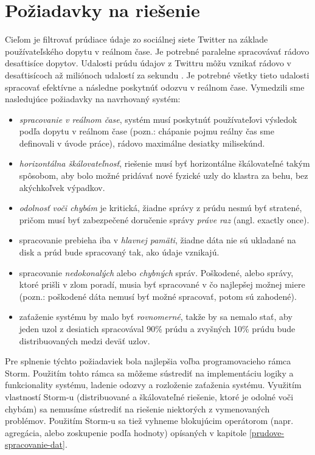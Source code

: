 \section{Požiadavky na riešenie}
Cieľom je filtrovať prúdiace údaje zo sociálnej siete Twitter na základe používateľského dopytu v reálnom čase. Je potrebné paralelne spracovávať rádovo desaťtisíce dopytov. Udalosti prúdu údajov z Twittru môžu vznikať rádovo v desaťtisícoch až miliónoch udalostí za sekundu \citep{mathioudakis2010twittermonitor}. Je potrebné všetky tieto udalosti spracovať efektívne a následne poskytnúť odozvu v reálnom čase. Vymedzili sme nasledujúce požiadavky na navrhovaný systém:
\begin{itemize}
	\item \textit{spracovanie v reálnom čase}, systém musí poskytnúť používateľovi výsledok podľa dopytu v reálnom čase (pozn.: chápanie pojmu reálny čas sme definovali v úvode práce), rádovo maximálne desiatky milisekúnd.
	\item \textit{horizontálna škálovateľnosť}, riešenie musí byť horizontálne škálovateľné takým spôsobom, aby bolo možné pridávať nové fyzické uzly do klastra za behu, bez akýchkoľvek výpadkov.
	\item \textit{odolnosť voči chybám} je kritická, žiadne správy z prúdu nesmú byť stratené, pričom musí byť zabezpečené doručenie správy \textit{práve raz} (angl. exactly once).
	\item spracovanie prebieha iba v \textit{hlavnej pamäti}, žiadne dáta nie sú ukladané na disk a prúd bude spracovaný tak, ako údaje vznikajú.
	\item spracovanie \textit{nedokonalých} alebo \textit{chybných} správ. Poškodené, alebo správy, ktoré prišli v zlom poradí, musia byť spracované v čo najlepšej možnej miere (pozn.: poškodené dáta nemusí byť možné spracovať, potom sú zahodené).
	\item zaťaženie systému by malo byť \textit{rovnomerné}, takže by sa nemalo stať, aby jeden uzol z desiatich spracovával 90\% prúdu a zvyšných 10\% prúdu bude distribuovaných medzi deväť uzlov.
\end{itemize} 
Pre splnenie týchto požiadaviek bola najlepšia voľba programovacieho rámca Storm. Použitím tohto rámca sa môžeme sústrediť na implementáciu logiky a funkcionality systému, ladenie odozvy a rozloženie zaťaženia systému. Využitím vlastností Storm-u (distribuované a škálovateľné riešenie, ktoré je odolné voči chybám) sa nemusíme sústrediť na riešenie niektorých z vymenovaných problémov. Použitím Storm-u sa tiež vyhneme blokujúcim operátorom (napr. agregácia, alebo zoskupenie podľa hodnoty) opísaných v kapitole \ref{prudove-spracovanie-dat}.

